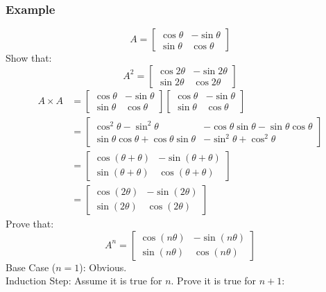 \documentclass[letterpaper, 12pt]{math}
\begin{document}
\subsubsection*{Example}
\[ A = \begin{bmatrix}
  \cos\theta & -\sin\theta \\
  \sin\theta & \cos\theta
\end{bmatrix} \]
Show that:
\[ A^2 = \begin{bmatrix}
  \cos2\theta & -\sin2\theta \\
  \sin2\theta & \cos2\theta
\end{bmatrix} \]
\begin{align*}
  A\times A &= \begin{bmatrix}
    \cos\theta & -\sin\theta \\
    \sin\theta & \cos\theta
  \end{bmatrix}\begin{bmatrix}
    \cos\theta & -\sin\theta \\
    \sin\theta & \cos\theta
  \end{bmatrix} \\
  &= \begin{bmatrix}
    \cos^2\theta-\sin^2\theta & -\cos\theta\sin\theta-\sin\theta\cos\theta \\
    \sin\theta\cos\theta+\cos\theta\sin\theta & -\sin^2\theta+\cos^2\theta
  \end{bmatrix} \\
  &= \begin{bmatrix}
    \cos(\theta+\theta) & -\sin(\theta+\theta) \\
    \sin(\theta+\theta) & \cos(\theta+\theta)
  \end{bmatrix} \\
  &= \begin{bmatrix}
    \cos(2\theta) & -\sin(2\theta) \\
    \sin(2\theta) & \cos(2\theta)
  \end{bmatrix}
\end{align*}
Prove that:
\[ A^n = \begin{bmatrix}
  \cos(n\theta) & -\sin(n\theta) \\
  \sin(n\theta) & \cos(n\theta)
\end{bmatrix} \]
Base Case (\( n = 1 \)): Obvious. \\
Induction Step: Assume it is true for \( n \). Prove it is true for \( n+1 \):
\end{document}
